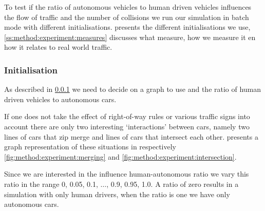 To test if the ratio of autonomous vehicles to human driven vehicles influences the flow of traffic and the number of collisions we run our simulation in batch mode with different initialisations.  presents the different initialisations we use, \cref{ss:method:experiment:measures} discusses what measure, how we measure it en how it relates to real world traffic. 

\subsubsection{Initialisation}
\label{ss:method:experiment:init}
As described in \cref{ss:method:experiment:init} we need to decide on a graph to use and the ratio of human driven vehicles to autonomous cars. 

If one does not take the effect of right-of-way rules or various traffic signs into account there are only two interesting `interactions' between cars, namely two lines of cars that zip merge and lines of cars that intersect each other.  presents a graph representation of these situations in respectively \cref{fig:method:experiment:merging} and \cref{fig:method:experiment:intersection}.

Since we are interested in the influence human-autonomous ratio we vary this ratio in the range 0, 0.05, 0.1, $\dotsc$, 0.9, 0.95, 1.0. A ratio of zero results in a simulation with only human drivers, when the ratio is one we have only autonomous cars. 


